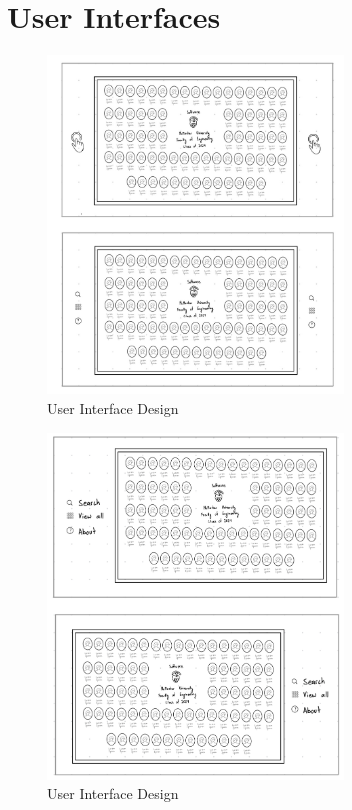 \documentclass[12pt, titlepage]{article}
\begin{document}

\section{User Interfaces}


\begin{figure}[H]
\centering
\includegraphics[width=0.7\textwidth]{IMG_0067.png}
\caption{User Interface Design}
\label{FigUH}
\end{figure}

\begin{figure}[H]
\centering
\includegraphics[width=0.7\textwidth]{IMG_0069.png}
\caption{User Interface Design}
\label{FigUH}
\end{figure}
\end{document}
